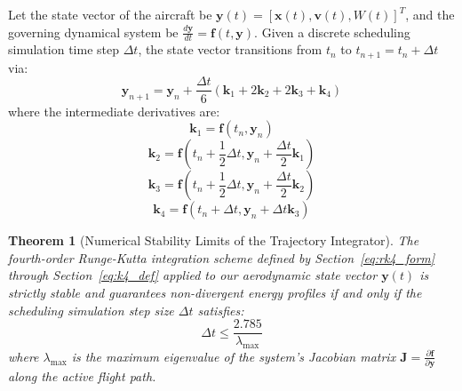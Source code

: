 \documentclass[11pt,a4paper]{book}
\newtheorem{theorem}{Theorem}
\begin{document}
Let the state vector of the aircraft be $\mathbf{y}(t) = [\mathbf{x}(t), \mathbf{v}(t), W(t)]^T$, and the governing dynamical system be $\frac{d\mathbf{y}}{dt} = \mathbf{f}(t, \mathbf{y})$. Given a discrete scheduling simulation time step $\Delta t$, the state vector transitions from $t_n$ to $t_{n+1} = t_n + \Delta t$ via:
\begin{equation}
\label{eq:rk4_form}
\mathbf{y}_{n+1} = \mathbf{y}_n + \frac{\Delta t}{6} \left( \mathbf{k}_1 + 2\mathbf{k}_2 + 2\mathbf{k}_3 + \mathbf{k}_4 \right)
\end{equation}
where the intermediate derivatives are:
\begin{equation}
\label{eq:k1_def}
\mathbf{k}_1 = \mathbf{f}(t_n, \mathbf{y}_n)
\end{equation}
\begin{equation}
\label{eq:k2_def}
\mathbf{k}_2 = \mathbf{f}\left(t_n + \frac{1}{2}\Delta t, \mathbf{y}_n + \frac{\Delta t}{2}\mathbf{k}_1 \right)
\end{equation}
\begin{equation}
\label{eq:k3_def}
\mathbf{k}_3 = \mathbf{f}\left(t_n + \frac{1}{2}\Delta t, \mathbf{y}_n + \frac{\Delta t}{2}\mathbf{k}_2 \right)
\end{equation}
\begin{equation}
\label{eq:k4_def}
\mathbf{k}_4 = \mathbf{f}\left(t_n + \Delta t, \mathbf{y}_n + \Delta t \mathbf{k}_3 \right)
\end{equation}

\begin{theorem}[Numerical Stability Limits of the Trajectory Integrator]
The fourth-order Runge-Kutta integration scheme defined by Section~\ref{eq:rk4_form} through Section~\ref{eq:k4_def} applied to our aerodynamic state vector $\mathbf{y}(t)$ is strictly stable and guarantees non-divergent energy profiles if and only if the scheduling simulation step size $\Delta t$ satisfies:
\begin{equation}
\label{eq:stability_condition}
\Delta t \le \frac{2.785}{\lambda_{\max}}
\end{equation}
where $\lambda_{\max}$ is the maximum eigenvalue of the system's Jacobian matrix $\mathbf{J} = \frac{\partial \mathbf{f}}{\partial \mathbf{y}}$ along the active flight path.
\end{theorem}
\end{document}
